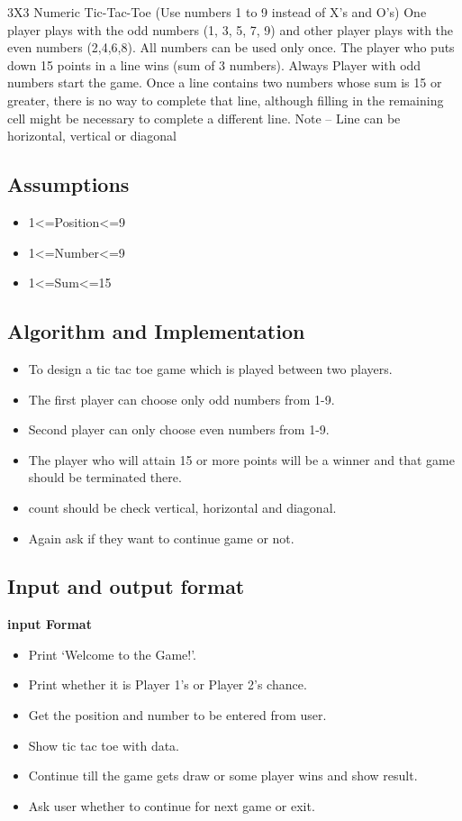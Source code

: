 \documentclass[a4paper,10pt]{report}
\begin{document}
3X3 Numeric Tic-Tac-Toe (Use numbers 1 to 9 instead of X’s and O’s)
One player plays with the odd numbers (1, 3, 5, 7, 9) and other player plays with the even numbers (2,4,6,8). 
All numbers can be used only once. The player who puts down 15 points in a line wins (sum of 3 numbers).
Always Player with odd numbers start the game. Once a line contains two numbers whose sum is 15 or greater, 
there is no way to complete that line, although filling in the remaining cell might be necessary to complete a different line.
Note – Line can be horizontal, vertical or diagonal

\subsection{Assumptions}
\begin{itemize}
 \item 1<=Position<=9
 \item 1<=Number<=9
 \item 1<=Sum<=15
\end{itemize}




\newpage
\subsection{Algorithm and Implementation}

\begin{itemize}
 \item To design a tic tac toe game which is played between two players.
 \item The first player can choose only odd numbers from 1-9.
 \item Second player can only choose even numbers from 1-9.
 \item The player who will attain 15 or more points will be a winner and that game should be terminated there.
 \item count should be check vertical, horizontal and diagonal.
 \item Again ask if they want to continue game or not.
\end{itemize}


\subsection{Input and output format}

\bf{input Format}
\begin{itemize}

\item Print ‘Welcome to the Game!’.    
\item Print whether it is Player 1’s or Player 2’s chance.
\item Get the position and number to be entered from user.
\item Show tic tac toe with data.
\item Continue till the game gets draw or some player wins and show result.
\item Ask user whether to continue for next game or exit.
\end{itemize}
\end{document}
